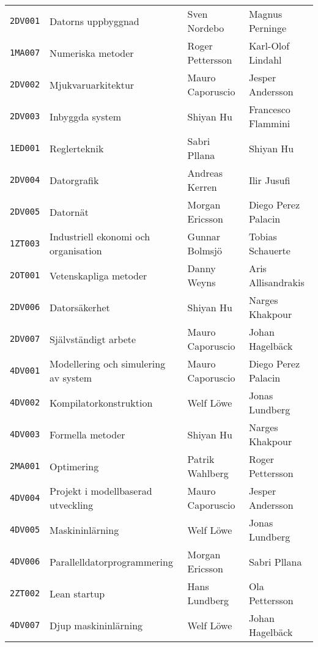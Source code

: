 \begin{longtable}[]{@{}cp{6cm}ll@{}}
\texttt{2DV001} & Datorns uppbyggnad                                    & Sven Nordebo      & Magnus Perninge     \tabularnewline
\texttt{1MA007} & Numeriska metoder                                     & Roger Pettersson  & Karl-Olof Lindahl   \tabularnewline
\texttt{2DV002} & Mjukvaruarkitektur                                    & Mauro Caporuscio  & Jesper Andersson    \tabularnewline
\texttt{2DV003} & Inbyggda system                                       & Shiyan Hu         & Francesco Flammini  \tabularnewline
\texttt{1ED001} & Reglerteknik                                          & Sabri Pllana      & Shiyan Hu           \tabularnewline
\texttt{2DV004} & Datorgrafik                                           & Andreas Kerren    & Ilir Jusufi         \tabularnewline
\texttt{2DV005} & Datornät                                              & Morgan Ericsson   & Diego Perez Palacin \tabularnewline
\texttt{1ZT003} & Industriell ekonomi och organisation                  & Gunnar Bolmsjö    & Tobias Schauerte    \tabularnewline
\texttt{2OT001} & Vetenskapliga metoder                                 & Danny Weyns       & Aris Allisandrakis  \tabularnewline
\texttt{2DV006} & Datorsäkerhet                                         & Shiyan Hu         & Narges Khakpour     \tabularnewline
\texttt{2DV007} & Självständigt arbete                                  & Mauro Caporuscio  & Johan Hagelbäck     \tabularnewline
\midrule
\texttt{4DV001} & Modellering och simulering av system                  & Mauro Caporuscio  & Diego Perez Palacin \tabularnewline
\texttt{4DV002} & Kompilatorkonstruktion                                & Welf Löwe         & Jonas Lundberg      \tabularnewline
\texttt{4DV003} & Formella metoder                                      & Shiyan Hu         & Narges Khakpour     \tabularnewline
\texttt{2MA001} & Optimering                                            & Patrik Wahlberg   & Roger Pettersson    \tabularnewline
\texttt{4DV004} & Projekt i modellbaserad utveckling                    & Mauro Caporuscio  & Jesper Andersson    \tabularnewline
\texttt{4DV005} & Maskininlärning                                       & Welf Löwe         & Jonas Lundberg      \tabularnewline
\texttt{4DV006} & Parallelldatorprogrammering                           & Morgan Ericsson   & Sabri Pllana        \tabularnewline
\texttt{2ZT002} & Lean startup                                          & Hans Lundberg     & Ola Pettersson      \tabularnewline
\texttt{4DV007} & Djup maskininlärning                                  & Welf Löwe         & Johan Hagelbäck     \tabularnewline

\end{longtable}
